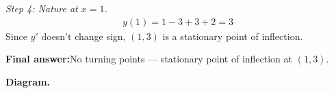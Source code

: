 \documentclass[11pt]{article}
\begin{document}
\textit{Step 4: Nature at \( x = 1 \).}
\[\begin{gathered}
y(1) = 1 - 3 + 3 + 2 = 3
\end{gathered}\]
Since \( y' \) doesn't change sign, \( (1, 3) \) is a stationary point of inflection.

\begin{answerbox}
\textbf{Final answer:}\quad No turning points --- stationary point of inflection at \(\displaystyle  (1, 3) \).
\end{answerbox}
\textbf{Diagram.}

\begin{center}
\end{center}
\end{document}
